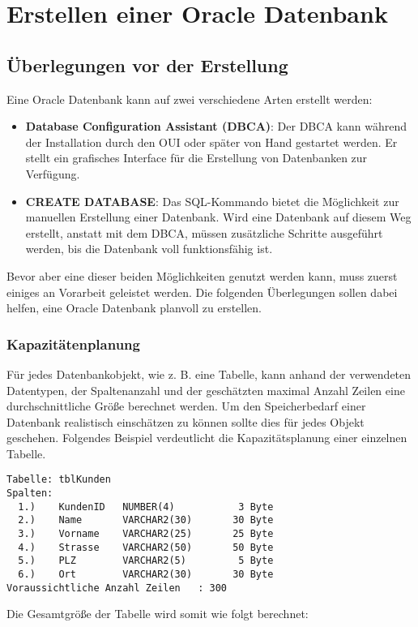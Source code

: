   \chapter{Erstellen einer Oracle Datenbank}
    \setcounter{page}{1}
    \minitoc
\newpage
    \section{\"Uberlegungen vor der Erstellung}
      Eine Oracle Datenbank kann auf zwei verschiedene Arten erstellt werden:
      \begin{itemize}
        \item \textbf{Database Configuration Assistant (DBCA)}: Der DBCA kann w\"ahrend der Installation durch den OUI oder sp\"ater von Hand gestartet werden. Er stellt ein grafisches Interface f\"ur die Erstellung von Datenbanken zur Verf\"ugung.
        \item \textbf{CREATE DATABASE}: Das SQL-Kommando  bietet die M\"oglichkeit zur manuellen Erstellung einer Datenbank. Wird eine Datenbank auf diesem Weg erstellt, anstatt mit dem DBCA, m\"ussen zus\"atzliche Schritte ausgef\"uhrt werden, bis die Datenbank voll funktionsf\"ahig ist.
      \end{itemize}
      Bevor aber eine dieser beiden M\"oglichkeiten genutzt werden kann, muss zuerst einiges an Vorarbeit geleistet werden. Die folgenden \"Uberlegungen sollen dabei helfen, eine Oracle Datenbank planvoll zu erstellen.
      \subsection{Kapazit\"atenplanung}
        F\"ur jedes Datenbankobjekt, wie z. B. eine Tabelle, kann anhand der verwendeten Datentypen, der Spaltenanzahl und der gesch\"atzten maximal Anzahl Zeilen eine durchschnittliche Gr\"o\ss e berechnet werden. Um den Speicherbedarf einer Datenbank realistisch einsch\"atzen zu k\"onnen sollte dies f\"ur jedes Objekt geschehen. Folgendes Beispiel verdeutlicht die Kapazit\"atsplanung einer einzelnen Tabelle.
          \begin{verbatim}
Tabelle: tblKunden
Spalten:
  1.)    KundenID   NUMBER(4)           3 Byte
  2.)    Name       VARCHAR2(30)       30 Byte
  3.)    Vorname    VARCHAR2(25)       25 Byte
  4.)    Strasse    VARCHAR2(50)       50 Byte
  5.)    PLZ        VARCHAR2(5)         5 Byte
  6.)    Ort        VARCHAR2(30)       30 Byte
Voraussichtliche Anzahl Zeilen   : 300
          \end{verbatim}
          Die Gesamtgr\"o\ss e der Tabelle  wird somit wie folgt berechnet:

